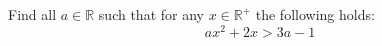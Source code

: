 Find all $a \in \mathbb{R}$ such that
for any $x \in \mathbb{R}^{+}$ the following holds:
\begin{equation*}
  a x^2 + 2x > 3a - 1
\end{equation*}
